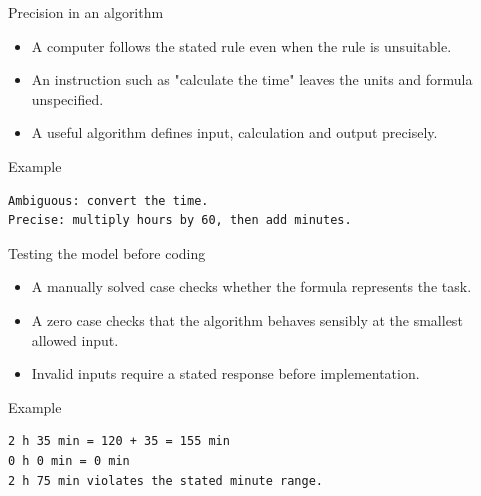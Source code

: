 \documentclass[10pt,aspectratio=169]{beamer}
\begin{document}
\begin{frame}[fragile,t]{Precision in an algorithm}
\begin{itemize}
\item A computer follows the stated rule even when the rule is unsuitable.
\item An instruction such as "calculate the time" leaves the units and formula unspecified.
\item A useful algorithm defines input, calculation and output precisely.
\end{itemize}
\vspace{1mm}\begin{block}{Example}
\begin{lstlisting}
Ambiguous: convert the time.
Precise: multiply hours by 60, then add minutes.
\end{lstlisting}
\end{block}
\end{frame}

\begin{frame}[fragile,t]{Testing the model before coding}
\begin{itemize}
\item A manually solved case checks whether the formula represents the task.
\item A zero case checks that the algorithm behaves sensibly at the smallest allowed input.
\item Invalid inputs require a stated response before implementation.
\end{itemize}
\vspace{1mm}\begin{block}{Example}
\begin{lstlisting}
2 h 35 min = 120 + 35 = 155 min
0 h 0 min = 0 min
2 h 75 min violates the stated minute range.
\end{lstlisting}
\end{block}
\end{frame}
\end{document}
